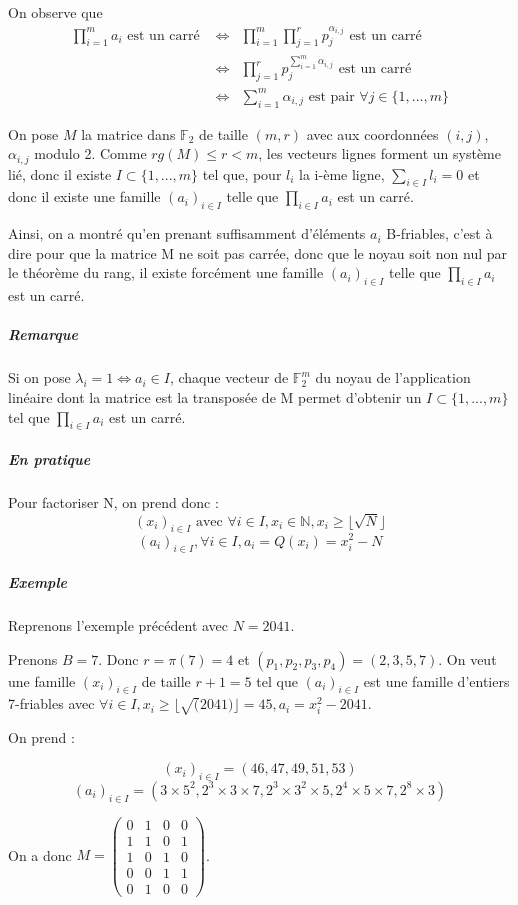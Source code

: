 \documentclass[11pt,a4paper]{article}
\begin{document}
	On observe que 
	\begin{eqnarray*}
		\prod_{i=1}^m a_i \text{ est un carré }  &\iff& \prod_{i=1}^m \prod_{j=1}^r p_j^{\alpha_{i,j}} \text{ est un carré} \\
		&\iff& \prod_{j=1}^r p_j^{\sum_{i=1}^m \alpha_{i,j}} \text{ est un carré } \\
		&\iff& \sum_{i=1}^m \alpha_{i,j} \text{ est pair } \forall j \in \{1, ..., m\}
	\end{eqnarray*}
	
	On pose $M$ la matrice dans $\mathbb{F}_2$ de taille $(m,r)$ avec aux coordonnées $(i,j)$,  $\alpha_{i,j}$ modulo 2. 
	Comme $rg(M) \le r < m$, les vecteurs lignes forment un système lié, donc il existe $I \subset \{1, ..., m\}$ tel que, pour $l_i$ la i-ème ligne, $\sum_{i \in I} l_i = 0$ et donc il existe une famille $(a_i)_{i \in I}$ telle que $\prod_{i \in I} a_i$ est un carré. 
	
	Ainsi, on a montré qu'en prenant suffisamment d'éléments $a_i$ B-friables, c'est à dire pour que la matrice M ne soit pas carrée, donc que le noyau soit non nul par le théorème du rang, il existe forcément une famille $(a_i)_{i \in I}$ telle que $\prod_{i \in I} a_i$ est un carré.
	
	\subparagraph{Remarque}
	Si on pose $\lambda_i = 1 \iff a_i \in I$, chaque vecteur de $\mathbb{F}_2^{m}$  du noyau de l'application linéaire dont la matrice est la transposée de M permet d'obtenir un $I \subset \{1,...,m\}$ tel que $\prod_{i \in I} a_i$ est un carré. 
	
	\subparagraph{En pratique}
	Pour factoriser N, on prend donc : 
	$$(x_i)_{i \in I} \text{ avec } \forall i \in I, x_i \in \mathbb{N}, x_i \ge \lfloor \sqrt{N} \rfloor$$
	$$ (a_i)_{i \in I}, \forall i \in I, a_i = Q(x_i) = x_i^2 - N$$
	
	\subparagraph{Exemple}
	Reprenons l'exemple précédent avec $N = 2041$.
	
	Prenons $B = 7$. Donc $r = \pi(7) = 4$ et $(p_1, p_2, p_3, p_4) = (2, 3, 5, 7)$.
	On veut une famille $(x_i)_{i \in I}$ de taille $r+1 = 5$ tel que $(a_i)_{i \in I}$ est une famille d'entiers 7-friables avec $\forall i \in I, x_i \ge \lfloor \sqrt(2041) \rfloor = 45, a_i = x_i^2 - 2041$. 
	
	On prend : 
	
	$$(x_i)_{i \in I} = (46, 47, 49, 51, 53)$$
	$$(a_i)_{i \in I} = (3 \times 5^2, 2^3 \times 3 \times 7, 2^3 \times 3^2 \times 5, 2^4 \times 5 \times 7, 2^8 \times 3)$$
	
	On a donc $M = 
	\begin{pmatrix}
		0 & 1 & 0 & 0 \\
		1 & 1 & 0 & 1 \\
		1 & 0 & 1 & 0 \\
		0 & 0 & 1 & 1 \\
		0 & 1 & 0 & 0 
	\end{pmatrix}$.
\end{document}
